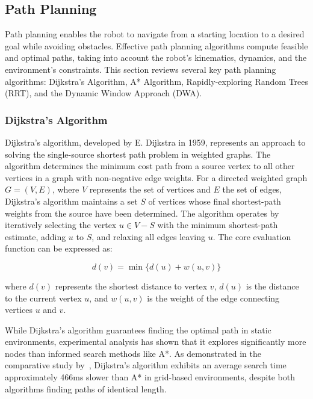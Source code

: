 \newpage

\subsection{Path Planning}
Path planning enables the robot to navigate from a starting
location to a desired goal while avoiding obstacles. Effective path planning algorithms compute feasible and
optimal paths, taking into account the robot's kinematics, dynamics, and the environment's constraints. This section
reviews several key path planning algorithms: Dijkstra's Algorithm, A* Algorithm, Rapidly-exploring Random Trees (RRT),
and the Dynamic Window Approach (DWA).


\subsubsection{Dijkstra's Algorithm}
Dijkstra's algorithm, developed by E. Dijkstra in 1959, represents an approach to solving the single-source shortest path problem in weighted graphs. The algorithm determines the minimum cost path from a source vertex to all other vertices in a graph with non-negative edge weights. For a directed weighted graph \(G = (V,E)\), where \(V\) represents the set of vertices and \(E\) the set of edges, Dijkstra's algorithm maintains a set \(S\) of vertices whose final shortest-path weights from the source have been determined. The algorithm operates by iteratively selecting the vertex \(u \in V - S\) with the 
minimum shortest-path estimate, adding \(u\) to \(S\), and relaxing all edges leaving \(u\). The core evaluation function can be expressed as:

\begin{equation}
    d(v) = \min \{d(u) + w(u,v)\}
\end{equation}

\noindent where \(d(v)\) represents the shortest distance to vertex \(v\), \(d(u)\) is the distance to the current vertex \(u\), and \(w(u,v)\) is the weight of the edge connecting vertices \(u\) and \(v\).



\noindent While Dijkstra's algorithm guarantees finding the optimal path in static 
environments, experimental analysis has shown that it explores significantly more nodes
than informed search methods like A*. As demonstrated in the comparative study
by~\cite{alija2015analysis}, Dijkstra's algorithm exhibits an average search time
approximately 466ms slower than A* in grid-based environments, despite both algorithms
finding paths of identical length.

